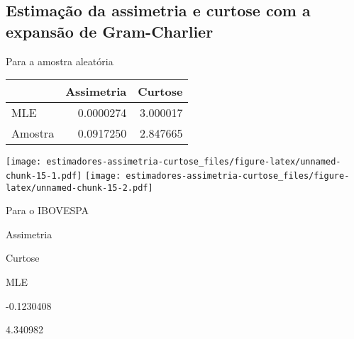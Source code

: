 \documentclass[]{article}
\newenvironment{Shaded}{\begin{snugshade}}{\end{snugshade}}
\newcommand{\KeywordTok}[1]{\textcolor[rgb]{0.13,0.29,0.53}{\textbf{#1}}}
\newcommand{\DataTypeTok}[1]{\textcolor[rgb]{0.13,0.29,0.53}{#1}}
\newcommand{\DecValTok}[1]{\textcolor[rgb]{0.00,0.00,0.81}{#1}}
\newcommand{\StringTok}[1]{\textcolor[rgb]{0.31,0.60,0.02}{#1}}
\newcommand{\OperatorTok}[1]{\textcolor[rgb]{0.81,0.36,0.00}{\textbf{#1}}}
\newcommand{\NormalTok}[1]{#1}
\begin{document}
\subsection{Estimação da assimetria e curtose com a expansão de
Gram-Charlier}\label{estimacao-da-assimetria-e-curtose-com-a-expansao-de-gram-charlier}

Para a amostra aleatória

\begin{tabular}{l|r|r}
\hline
  & Assimetria & Curtose\\
\hline
MLE & 0.0000274 & 3.000017\\
\hline
Amostra & 0.0917250 & 2.847665\\
\hline
\end{tabular}

\begin{Shaded}
\end{Shaded}

\texttt{[image: estimadores-assimetria-curtose\_files/figure-latex/unnamed-chunk-15-1.pdf]}
\texttt{[image: estimadores-assimetria-curtose\_files/figure-latex/unnamed-chunk-15-2.pdf]}

Para o IBOVESPA

Assimetria

Curtose

MLE

-0.1230408

4.340982
\end{document}
